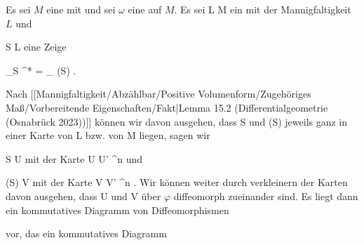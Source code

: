 {

Es sei $M$ eine
mit
und sei $\omega$ eine
auf $M$. Es sei
\maabbdisp {\varphi} { L } { M
} {}
ein
mit der Mannigfaltigkeit $L$ und

\mavergleichskette
{\vergleichskette
{ S
}
{ \subseteq }{ L
}
{  }{
}
{    }{
}
{   }{
}
}
{}{}{}
eine
Zeige

\mavergleichskettedisp
{\vergleichskette
{ \int_S \varphi^* \omega
}
{ =} { \int_{ \varphi(S)} \omega
}
{ } {
}
{ } {
}
{ } {
}
}
{}{}{.}

}
{

Nach
[[Mannigfaltigkeit/Abzählbar/Positive Volumenform/Zugehöriges Maß/Vorbereitende Eigenschaften/Fakt|Lemma 15.2 (Differentialgeometrie (Osnabrück 2023))]]
können wir davon ausgehen, dass
\mathkor {} {S} {und} {\varphi(S)} {}
jeweils ganz in einer Karte von
\mathkor {} {L} {bzw. von} {M} {}
liegen, sagen wir

\mavergleichskette
{\vergleichskette
{ S
}
{ \subseteq }{ U
}
{  }{
}
{    }{
}
{   }{
}
}
{}{}{}
mit der Karte
\maabbdisp {\alpha} { U } { U' \subseteq \R^n
} {}
und

\mavergleichskette
{\vergleichskette
{ \varphi(S)
}
{ \subseteq }{ V
}
{  }{
}
{    }{
}
{   }{
}
}
{}{}{}
mit der Karte
\maabbdisp {\beta} { V } { V' \subseteq \R^n
} {.}
Wir können weiter durch verkleinern der Karten davon ausgehen, dass
\mathkor {} {U} {und} {V} {}
über $\varphi$ diffeomorph zueinander sind. Es liegt dann ein kommutatives Diagramm von Diffeomorphismen

 {  }

vor, das ein kommutatives Diagramm

 {  }

}
